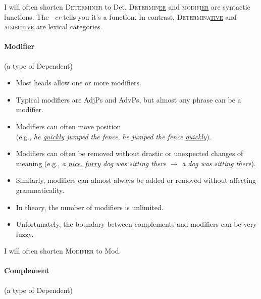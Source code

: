 I will often shorten \textsc{Determiner} to Det. \textsc{Determin\uline{er}} and \textsc{modifi\uline{er}} are syntactic functions. The \textit{--er} tells you it's a function. In contrast, \textsc{Determina\uline{tive}} and \textsc{adjec\uline{tive}} are lexical categories.

\paragraph*{Modifier} \label{sec:modifier}(a type of Dependent)

\begin{itemize}[noitemsep]
    \item {}Most heads allow one or more modifiers.
    \item Typical modifiers are AdjPs and AdvPs, but almost any phrase can be a modifier.
    \item Modifiers can often move position \\(e.g., \textit{he \uline{quickly} jumped the fence}, \textit{he jumped the fence \uline{quickly}}).
    \item Modifiers can often be removed without drastic or unexpected changes of meaning (e.g., \textit{a \uline{nice, furry} dog was sitting there} $\rightarrow$ \textit{a dog was sitting there}).
    \item Similarly, modifiers can almost always be added or removed without affecting grammaticality.
    \item In theory, the number of modifiers is unlimited.
    \item Unfortunately, the boundary between complements and modifiers can be very fuzzy.
\end{itemize}

I will often shorten \textsc{Modifier} to Mod.

\paragraph*{Complement} \label{sec:complement}(a type of Dependent)

